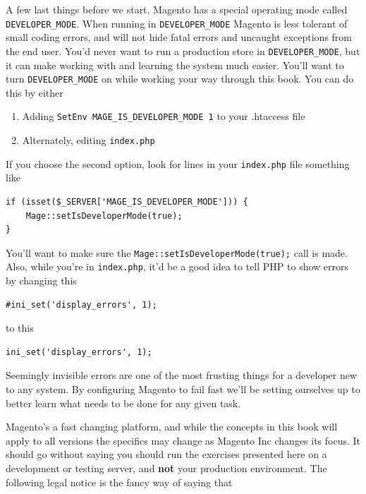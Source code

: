 \documentclass[oneside]{book}
\begin{document}
A few last things before we start.  Magento has a special operating mode called \footnotesize\texttt{DEVELOPER\_MODE}\normalsize.  When running in \footnotesize\texttt{DEVELOPER\_MODE} \normalsize  Magento is less tolerant of small coding errors, and will not hide fatal errors and uncaught exceptions from the end user.  You'd never want to run a production store in \footnotesize\texttt{DEVELOPER\_MODE}\normalsize, but it can make working with and learning the system much easier.  You'll want to turn \footnotesize\texttt{DEVELOPER\_MODE} \normalsize  on while working your way through this book.  You can do this by either

\begin{enumerate}
\item Adding \footnotesize\texttt{SetEnv MAGE\_IS\_DEVELOPER\_MODE 1} \normalsize  to your .htaccess file
\item Alternately, editing \footnotesize\texttt{index.php} \normalsize
\end{enumerate}


If you choose the second option, look for lines in your \footnotesize\texttt{index.php} \normalsize  file something like

\begin{lstlisting}
if (isset($_SERVER['MAGE_IS_DEVELOPER_MODE'])) {
    Mage::setIsDeveloperMode(true);
}

\end{lstlisting}


You'll want to make sure the \footnotesize\texttt{Mage::setIsDeveloperMode(true);} \normalsize  call is made.  Also, while you're in \footnotesize\texttt{index.php}\normalsize, it'd be a good idea to tell PHP to show errors by changing this

\begin{lstlisting}
#ini_set('display_errors', 1);

\end{lstlisting}


to this

\begin{lstlisting}
ini_set('display_errors', 1);

\end{lstlisting}


Seemingly invisible errors are one of the most frusting things for a developer new to any system.  By configuring Magento to fail fast we'll be setting ourselves up to better learn what needs to be done for any given task.

Magento's a fast changing platform, and while the concepts in this book will apply to all versions the specifics may change as Magento Inc changes its focus.  It should go without saying you should run the exercises presented here on a development or testing server, and \textbf{not} your production environment.  The following legal notice is the fancy way of saying that
\end{document}
